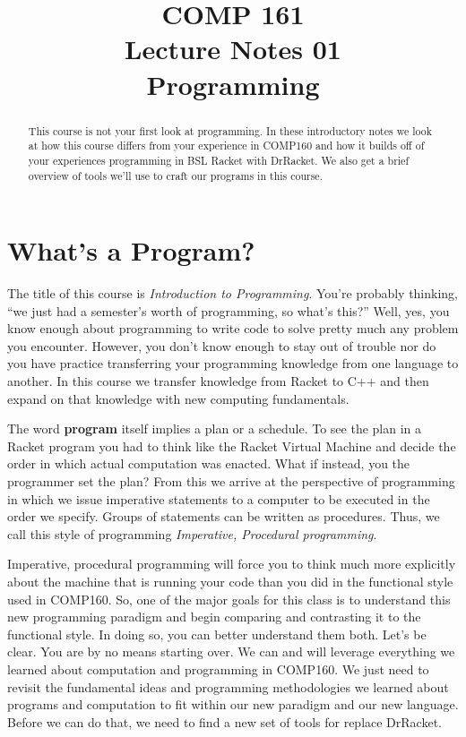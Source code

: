 \documentclass[nobib]{tufte-handout}
\title{COMP 161 \\ Lecture Notes 01 \\ Programming}
\begin{document}
\maketitle

\begin{abstract}
This course is not your first look at programming. In these introductory notes we look at how this course differs from your experience in COMP160 and how it builds off of your experiences programming in BSL Racket with DrRacket.  We also get a brief overview of tools we'll use to craft our programs in this course.
\end{abstract}

\section{What's a Program?}

The title of this course is \textit{Introduction to Programming}.  You're probably thinking, ``we just had a semester's worth of programming, so what's this?''  Well, yes, you know enough about programming to write code to solve pretty much any problem you encounter. However, you don't know enough to stay out of trouble nor do you have practice transferring your programming knowledge from one language to another. In this course we transfer knowledge from Racket to C++ and then expand on that knowledge with new computing fundamentals.

The word \textbf{program} itself implies a plan or a schedule. To see the plan in a Racket program you had to think like the Racket Virtual Machine and decide the order in which actual computation was enacted. What if instead, you the programmer set the plan? From this we arrive at the perspective of programming in which we issue imperative statements to a computer to be executed in the order we specify. Groups of statements can be written as procedures. Thus, we call this style of programming \textit{Imperative, Procedural programming}.

Imperative, procedural programming will force you to think much more explicitly about the machine that is running your code than you did in the functional style used in COMP160. So, one of the major goals for this class is to understand this new programming paradigm and begin comparing and contrasting it to the functional style. In doing so, you can better understand them both. Let's be clear. You are by no means starting over.  We can and will leverage everything we learned about computation and programming in COMP160. We just need to revisit the fundamental ideas and programming methodologies we learned about programs and computation to fit within our new paradigm and our new language. Before we can do that, we need to find a new set of tools for replace DrRacket.
\end{document}
